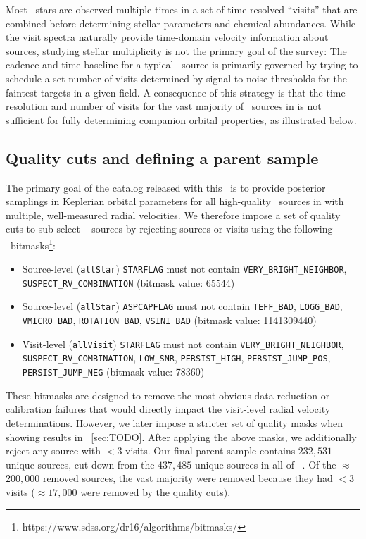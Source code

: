\documentclass[modern]{aastex62}
\begin{document}
Most \apogee\ stars are observed multiple times in a set of time-resolved
``visits'' that are combined before determining stellar parameters and chemical
abundances.
While the visit spectra naturally provide time-domain velocity information about
sources, studying stellar multiplicity is not the primary goal of the survey:
The cadence and time baseline for a typical \apogee\ source is primarily
governed by trying to schedule a set number of visits determined by
signal-to-noise thresholds for the faintest targets in a given field.
A consequence of this strategy is that the time resolution and number of visits
for the vast majority of \apogee\ sources in  is not sufficient for fully
determining companion orbital properties, as illustrated below.

\subsection{Quality cuts and defining a parent sample}

The primary goal of the catalog released with this \documentname\ is to provide
posterior samplings in Keplerian orbital parameters for all high-quality
\apogee\ sources in  with multiple, well-measured radial velocities.
We therefore impose a set of quality cuts to sub-select \apogee\  sources
by rejecting sources or visits using the following \apogee\
bitmasks\footnote{https://www.sdss.org/dr16/algorithms/bitmasks/}:
\begin{itemize}
    \item Source-level (\texttt{allStar}) \texttt{STARFLAG} must not contain \texttt{VERY\_BRIGHT\_NEIGHBOR}, \texttt{SUSPECT\_RV\_COMBINATION} (bitmask value: 65544)
    \item Source-level (\texttt{allStar}) \texttt{ASPCAPFLAG} must not contain \texttt{TEFF\_BAD}, \texttt{LOGG\_BAD}, \texttt{VMICRO\_BAD}, \texttt{ROTATION\_BAD}, \texttt{VSINI\_BAD} (bitmask value: 1141309440)
    \item Visit-level (\texttt{allVisit}) \texttt{STARFLAG} must not contain \texttt{VERY\_BRIGHT\_NEIGHBOR}, \texttt{SUSPECT\_RV\_COMBINATION}, \texttt{LOW\_SNR}, \texttt{PERSIST\_HIGH}, \texttt{PERSIST\_JUMP\_POS}, \texttt{PERSIST\_JUMP\_NEG} (bitmask value: 78360)
\end{itemize}
These bitmasks are designed to remove the most obvious data reduction or calibration failures that would directly impact the visit-level radial velocity determinations.
However, we later impose a stricter set of quality masks when showing results in \sectionname~\ref{sec:TODO}.
After applying the above masks, we additionally reject any source with $<3$
visits.
Our final parent sample contains $232,531$ unique sources, cut down from the
$437,485$ unique sources in all of \apogee\ \dr{16}.
Of the $\approx$$200,000$ removed sources, the vast majority were removed because they had $<3$ visits ($\approx$$17,000$ were removed by the quality cuts).
\end{document}
